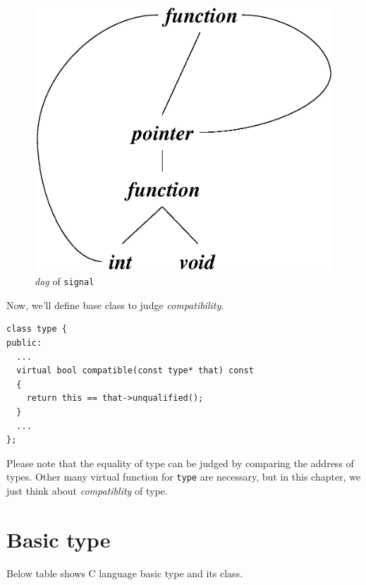\hspace{0.5cm}
\begin{figure}[htbp]
\begin{center}
\includegraphics[width=0.5\linewidth,height=0.5\linewidth]{dag.eps}
\caption{{\em dag} of {\tt{signal}}}
\label{type_e000}
\end{center}
\end{figure}

Now, we'll define base class to judge {\it compatibility}.
\begin{verbatim}
class type {
public:
  ...
  virtual bool compatible(const type* that) const
  {
    return this == that->unqualified();
  }
  ...
};
\end{verbatim}
Please note that the equality of type can be judged by
comparing the address of types.
Other many virtual function for {\tt{type}} are necessary,
but in this chapter, we just think about {\it compatiblity} of type.

\section{Basic type}

Below table shows C language basic type and its class.

\vspace{0.5cm}

